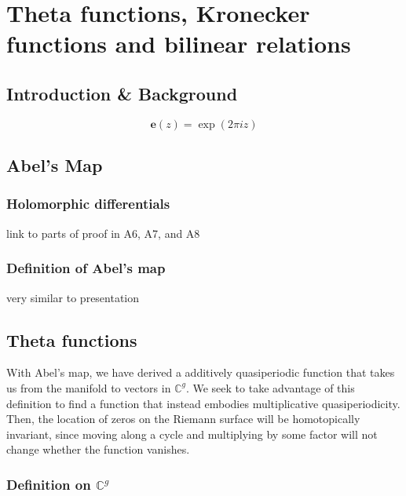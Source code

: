 

\newcommand{\bolde}[0]{\mathbf{e}}

\chapter{Theta functions, Kronecker functions and bilinear relations}
\label{rep:B12}

\section{Introduction \& Background}

\begin{equation}
    \bolde(z) = \exp(2\pi i z)
\end{equation}

\section{Abel's Map}

\subsection{Holomorphic differentials}
link to parts of proof in A6, A7, and A8

\subsection{Definition of Abel's map}
very similar to presentation

\section{Theta functions}

With Abel's map, we have derived a additively quasiperiodic function that takes us from the manifold to vectors in $\mathbb C^g$. We seek to take advantage of this definition to find a function that instead embodies multiplicative quasiperiodicity. Then, the location of zeros on the Riemann surface will be homotopically invariant, since moving along a cycle and multiplying by some factor will not change whether the function vanishes.

\subsection{Definition on $\mathbb C^g$}

